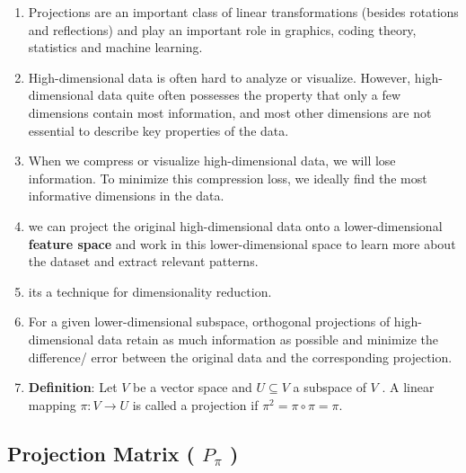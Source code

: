 \begin{enumerate}
    \item Projections are an important class of linear transformations (besides rotations and reflections) and play an important role in graphics, coding theory, statistics and machine learning.
    \hfill \cite{mfml/book/mml/Deisenroth-Faisal-Ong}

    \item High-dimensional data is often hard to analyze or visualize. 
    However, high-dimensional data quite often possesses the property that only a few dimensions contain most information, and most other dimensions are not essential to describe key properties of the data. 
    \hfill \cite{mfml/book/mml/Deisenroth-Faisal-Ong}

    \item When we compress or visualize high-dimensional data, we will lose information. To minimize this compression loss, we ideally find the most informative dimensions in the data.
    \hfill \cite{mfml/book/mml/Deisenroth-Faisal-Ong}

    \item we can project the original high-dimensional data onto a lower-dimensional \textbf{feature space} and work in this lower-dimensional space to learn more about the dataset and extract relevant patterns.
    \hfill \cite{mfml/book/mml/Deisenroth-Faisal-Ong}

    \item its a technique for dimensionality reduction.
    \hfill \cite{mfml/book/mml/Deisenroth-Faisal-Ong}

    \item For a given lower-dimensional subspace, orthogonal projections of high-dimensional data retain as much information as possible and minimize the difference/ error between the original data and the corresponding projection.
    \hfill \cite{mfml/book/mml/Deisenroth-Faisal-Ong}

    \item \textbf{Definition}: Let $V$ be a vector space and $U \subseteq V$ a subspace of $V$ . 
    A linear mapping $\pi : V \to U$ is called a projection if $\pi^2 = \pi \circ \pi = \pi$.
    \hfill \cite{mfml/book/mml/Deisenroth-Faisal-Ong}
\end{enumerate}



\subsection{Projection Matrix ( $P_\pi$ )}

